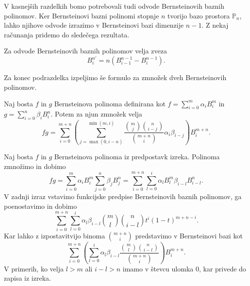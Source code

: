 \documentclass[isrm2, tisk]{fmfdelo}
\begin{document}
    V kasnejših razdelkih bomo potrebovali tudi odvode Bernsteinovih baznih polinomov.
    Ker Bernsteinovi bazni polinomi stopnje $n$ tvorijo bazo prostora $\mathbb{P}_n$, lahko njihove odvode izrazimo v Bernsteinovi bazi dimenzije $n-1$.
    Z nekaj računanja pridemo do sledečega rezultata.
    \begin{izrek}
        \label{izrek:bernstein-odvod}
        Za odvode Bernsteinovih baznih polinomov velja zveza
        \[B_{i}^{n\prime}=n(B_{i-1}^{n-1} - B_{i}^{n-1}).\]
    \end{izrek}
    Za konec podrazdelka izpeljimo še formulo za zmnožek dveh Bernsteinovih polinomov.
    \begin{izrek}
        Naj bosta $f$ in $g$ Bernsteinova polinoma definirana kot $f=\sum_{i=0}^{m}\alpha_iB_i^m$ in $g=\sum_{i=0}^{n}\beta_iB_i^n$.
        Potem za njun zmnožek velja
        \[ fg = \sum_{i=0}^{m+n}\left(\sum_{j=\max(0,i-n)}^{\min(m,i)} \frac{\binom{m}{j}\binom{n}{i-j}}{\binom{m+n}{i}} \alpha_i\beta_{i-j} \right)B_{i}^{m+n}.\]
    \end{izrek}
    \begin{dokaz}
        Naj bosta $f$ in $g$ Bernsteinova polinoma iz predpostavk izreka.
        Polinoma zmnožimo in dobimo
        \[fg =\sum_{i=0}^{m}\alpha_iB_{i}^{m}\sum_{j=0}^{n}\beta_jB_{j}^{n} = \sum_{i=0}^{m+n}\sum_{l=0}^i \alpha_lB_{l}^{m}\beta_{i-l}B_{i-l}^{n}. \]
        V zadnji izraz vstavimo funkcijske predpise Bernsteinovih baznih polinomov, ga poenostavimo in dobimo
        \[\sum_{i=0}^{m+n}\sum_{l=0}^i \alpha_l \beta_{i-l} \binom{m}{l}\binom{n}{i-l}t^{i}(1-t)^{m+n-i}.\]
        Kar lahko z izpostavitvijo binoma $\binom{m+n}{i}$ predstavimo v Bernsteinovi bazi kot
        \[\sum_{i=0}^{m+n} \left(\sum_{l=0}^i  \alpha_l \beta_{i-l}\frac{\binom{m}{l}\binom{n}{i-l}}{\binom{m+n}{i}}\right) B_{i}^{m+n}.\]
        V primerih, ko velja $l>m$ ali $i-l>n$ imamo v števcu ulomka $0$, kar privede do zapisa iz izreka.
    \end{dokaz}
\end{document}
